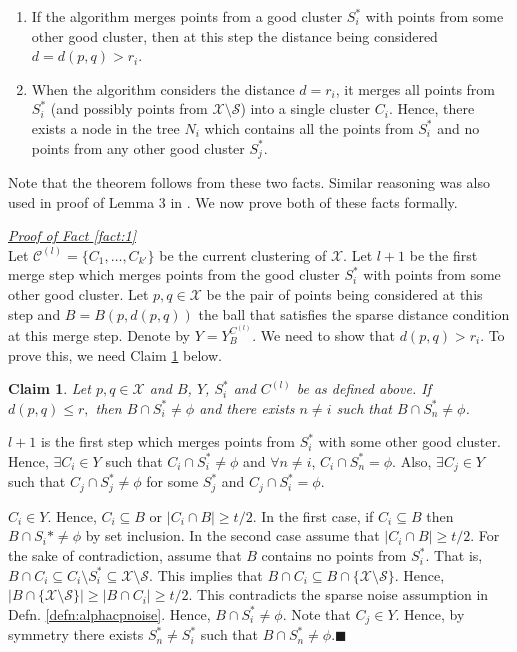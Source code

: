 \documentclass[orivec]{llncs}
\newtheorem{smallLemma}{Claim}
\newcommand{\mc}{\mathcal}
\renewcommand{\qed}{\hfill\ensuremath{\blacksquare}}
\renewcommand\labelitemi{$\bullet$}
\begin{document}
\begin{enumerate}[nolistsep, noitemsep, label=\textbf{F.\arabic*}]
\renewcommand\labelitemi{$\diamond$}
\item \label{fact:1} If the algorithm merges points from a good cluster $S_i^*$ with points from some other good cluster,  then at this step the distance being considered $d = d(p,q) > r_i$.	
\item \label{fact:2} When the algorithm considers the distance $d = r_i$, it merges all points from $S_i^*$ (and possibly points from $\mc X\setminus \mc S$) into a single cluster $C_i$. Hence, there exists a node in the tree $N_i$ which contains all the points from $S_i^*$ and no points from any other good cluster $S_j^*$. 	
\end{enumerate}
Note that the theorem follows from these two facts. Similar reasoning was also used in proof of Lemma 3 in \cite{balcan2012clustering}. We now prove both of these facts formally. 

\noindent\textit{\underline{Proof of Fact \ref{fact:1}}}\\
Let $\mc C^{(l)} = \{C_1, \ldots, C_{k'}\}$ be the current clustering of $\mc X$. Let $l+1$ be the first merge step which merges points from the good cluster $S_i^*$ with points from some other good cluster. Let $p, q \in \mc X$ be the pair of points being considered at this step and $B = B(p, d(p, q))$ the ball that satisfies the sparse distance condition at this merge step. Denote by $Y = Y_{B}^{C^{(l)}}$. We need to show that $d(p, q) > r_i$. To prove this, we need Claim \ref{claim:fromBothCluster} below. 

\begin{smallLemma}
\label{claim:fromBothCluster}
Let $p, q \in \mc X$ and $B$, $Y$, $S_i^*$ and $C^{(l)}$ be as defined above. If $d(p, q) \le r,$ then $B \cap S_i^* \neq \phi$ and there exists $n \neq i$ such that $B \cap S_n^* \neq \phi$.
\end{smallLemma}
\vspace{-0.1in} $l+1$ is the first step which merges points from $S_i^*$ with some other good cluster. Hence, $\exists C_i \in Y$ such that $C_i\cap S_i^*  \neq \phi$ and $\forall n \neq i$, $C_i \cap S_n^* = \phi$. Also, $\exists C_j \in Y$ such that $C_j \cap S_j^* \neq \phi$ for some $S_j^*$ and $C_j \cap S_i^* = \phi$.

$C_i \in Y$. Hence, $C_i \subseteq B$ or $|C_i \cap B| \ge t/2$. In the first case, if $C_i \subseteq B$ then $B \cap S_i* \neq \phi$ by set inclusion. In the second case assume that $|C_i \cap B| \ge t/2$. For the sake of contradiction, assume that $B$ contains no points from $S_i^*$. That is, $B \cap C_i \subseteq C_i \setminus S_i^* \subseteq \mc X \setminus \mc S$. This implies that $B \cap C_i \subseteq B \cap \{\mc X \setminus \mc S\}$. Hence, $|B\cap \{\mc X \setminus \mc S\}| \ge |B \cap C_i| \ge t/2$. This contradicts the sparse noise assumption in Defn. \ref{defn:alphacpnoise}. Hence, $B \cap S_i^* \neq \phi$. Note that $C_j \in Y$. Hence, by symmetry there exists $S_n^* \neq S_i^*$ such that $B \cap S_n^* \neq \phi$.\qed
\end{document}
